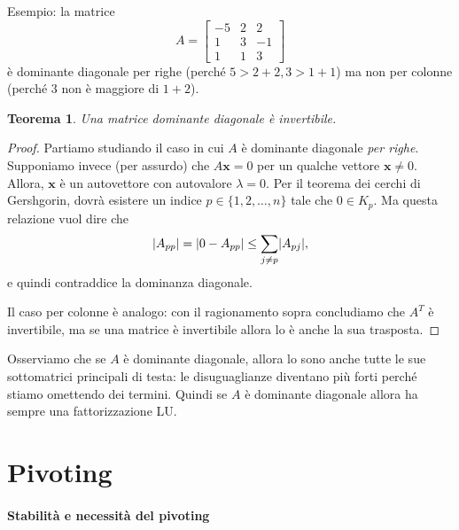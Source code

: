 \documentclass[a4paper]{report}
\DeclarePairedDelimiter{\abs}{\lvert}{\rvert}
\newtheorem{theorem}{Teorema}[chapter]
\theoremstyle{definition}
\theoremstyle{remark}
\begin{document}
Esempio: la matrice
\[
A = 
\begin{bmatrix}
    -5 & 2 & 2\\
    1 & 3 & -1\\
    1 & 1 & 3
\end{bmatrix}
\]
è dominante diagonale per righe (perché $5 > 2+2, 3 > 1+1$) ma non per colonne (perché $3$ non è maggiore di $1+2$). 

\begin{theorem}
Una matrice dominante diagonale è invertibile.
\end{theorem}
\begin{proof}
Partiamo studiando il caso in cui $A$ è dominante diagonale \emph{per righe}. Supponiamo invece (per assurdo) che $A\mathbf{x}=0$ per un qualche vettore $\mathbf{x}\neq 0$. Allora, $\mathbf{x}$ è un autovettore con autovalore $\lambda=0$. Per il teorema dei cerchi di Gershgorin, dovrà esistere un indice $p\in \{1,2,\dots,n\}$ tale che $0 \in K_p$. Ma questa relazione vuol dire che
\[
\abs{A_{pp}} = \abs{0 - A_{pp}} \leq \sum_{j\neq p} \abs{A_{pj}},
\]
e quindi contraddice la dominanza diagonale.

Il caso per colonne è analogo: con il ragionamento sopra concludiamo che $A^T$ è invertibile, ma se una matrice è invertibile allora lo è anche la sua trasposta.
\end{proof}
Osserviamo che se $A$ è dominante diagonale, allora lo sono anche tutte le sue sottomatrici principali di testa: le disuguaglianze diventano più forti perché stiamo omettendo dei termini. Quindi se $A$ è dominante diagonale allora ha sempre una fattorizzazione LU.

\section{Pivoting}

\paragraph{Stabilità e necessità del pivoting}
\end{document}
